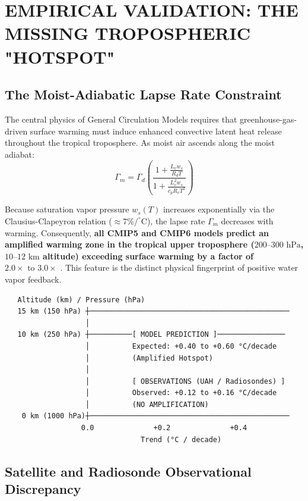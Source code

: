 \documentclass[10pt,twocolumn]{article}
\begin{document}
\section{EMPIRICAL VALIDATION: THE MISSING TROPOSPHERIC "HOTSPOT"}


\subsection{The Moist-Adiabatic Lapse Rate Constraint}

The central physics of General Circulation Models requires that greenhouse-gas-driven surface warming must induce enhanced convective latent heat release throughout the tropical troposphere. As moist air ascends along the moist adiabat:
\begin{equation}
  \Gamma_m = \Gamma_d \left( \frac{1 + \frac{L_v w_s}{R_d T}}{1 + \frac{L_v^2 w_s}{c_p R_v T^2}} \right)
\end{equation}

Because saturation vapor pressure $w_s(T)$ increases exponentially via the Clausius-Clapeyron relation ($\approx 7\%/^\circ\text{C}$), the lapse rate $\Gamma_m$ decreases with warming. Consequently, \textbf{all CMIP5 and CMIP6 models predict an amplified warming zone in the tropical upper troposphere ($200\text{--}300\text{ hPa}$, $10\text{--}12\text{ km}$ altitude) exceeding surface warming by a factor of $2.0\times\text{ to }3.0\times$} \cite{IPCC_AR4_WG1, Santer2008}. This feature is the distinct physical fingerprint of positive water vapor feedback.

\begin{verbatim}
   Altitude (km) / Pressure (hPa)
   15 km (150 hPa) ┼───────────────────────────────────────────────
                   │
   10 km (250 hPa) ┼──────────[ MODEL PREDICTION ]────────────────
                   │          Expected: +0.40 to +0.60 °C/decade
                   │          (Amplified Hotspot)
                   │
                   │          [ OBSERVATIONS (UAH / Radiosondes) ]
                   │          Observed: +0.12 to +0.16 °C/decade
                   │          (NO AMPLIFICATION)
    0 km (1000 hPa)┼───────────────────────────────────────────────
                  0.0              +0.2              +0.4
                                Trend (°C / decade)
\end{verbatim}


\subsection{Satellite and Radiosonde Observational Discrepancy}
\end{document}

